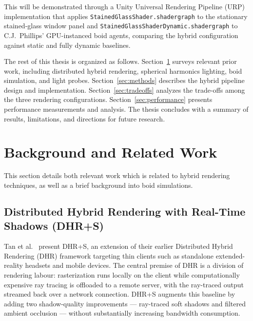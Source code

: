 \documentclass[12pt]{article}
\begin{document}
This will be demonstrated through a Unity Universal Rendering Pipeline (URP) implementation that applies \texttt{StainedGlassShader.shadergraph} to the stationary stained-glass window panel and \texttt{StainedGlassShaderDynamic.shadergraph} to C.J.\ Phillips' GPU-instanced boid agents, comparing the hybrid configuration against static and fully dynamic baselines.

The rest of this thesis is organized as follows. Section~\ref{sec:background} surveys relevant prior work, including distributed hybrid rendering, spherical harmonics lighting, boid simulation, and light probes. Section~\ref{sec:methods} describes the hybrid pipeline design and implementation. Section~\ref{sec:tradeoffs} analyzes the trade-offs among the three rendering configurations. Section~\ref{sec:performance} presents performance measurements and analysis. The thesis concludes with a summary of results, limitations, and directions for future research.

\clearpage
\section{Background and Related Work}
\label{sec:background}

This section details both relevant work which is related to hybrid rendering techniques, as well as a brief background into boid simulations. 

\subsection{Distributed Hybrid Rendering with Real-Time Shadows (DHR+S)}
\label{subsec:dhrs}
 
Tan et al.\ \cite{TanLowChow2024} present DHR+S, an extension of their earlier Distributed Hybrid Rendering (DHR) framework targeting thin clients such as standalone extended-reality headsets and mobile devices. The central premise of DHR is a division of rendering labour: rasterization runs locally on the client while computationally expensive ray tracing is offloaded to a remote server, with the ray-traced output streamed back over a network connection. DHR+S augments this baseline by adding two shadow-quality improvements --- ray-traced soft shadows and filtered ambient occlusion --- without substantially increasing bandwidth consumption.
 
\end{document}
